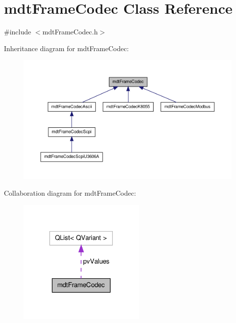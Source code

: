 \hypertarget{classmdt_frame_codec}{\section{mdt\-Frame\-Codec Class Reference}
\label{classmdt_frame_codec}
}


{\ttfamily \#include $<$mdt\-Frame\-Codec.\-h$>$}



Inheritance diagram for mdt\-Frame\-Codec\-:
\nopagebreak
\begin{figure}[H]
\begin{center}
\leavevmode
\includegraphics[width=350pt]{classmdt_frame_codec__inherit__graph}
\end{center}
\end{figure}


Collaboration diagram for mdt\-Frame\-Codec\-:
\nopagebreak
\begin{figure}[H]
\begin{center}
\leavevmode
\includegraphics[width=176pt]{classmdt_frame_codec__coll__graph}
\end{center}
\end{figure}
